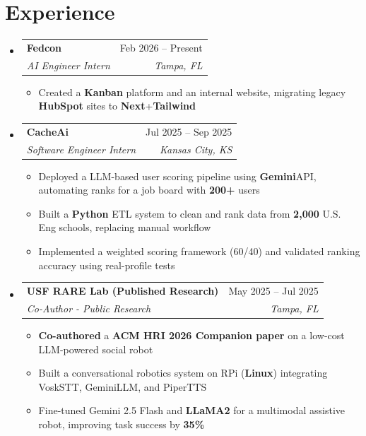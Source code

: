 \documentclass[letterpaper,11pt]{article}
\makeatletter
\newcommand{\resumeItem}[1]{
  \item\small{
    {#1 \vspace{-2pt}}
  }
}
\newcommand{\resumeSubheading}[4]{
  \vspace{-2pt}\item
    \begin{tabular*}{0.97\textwidth}[t]{l@{\extracolsep{\fill}}r}
      \textbf{#1} & #2 \\
      \textit{\small#3} & \textit{\small #4} \\
    \end{tabular*}\vspace{-7pt}
}
\newcommand{\resumeSubSubheading}[2]{
    \item
    \begin{tabular*}{0.97\textwidth}{l@{\extracolsep{\fill}}r}
      \textit{\small#1} & \textit{\small #2} \\
    \end{tabular*}\vspace{-7pt}
}
\newcommand{\resumeSubHeadingListStart}{\begin{itemize}[leftmargin=0.15in, label={}]}
\newcommand{\resumeSubHeadingListEnd}{\end{itemize}}
\newcommand{\resumeItemListStart}{\begin{itemize}}
\newcommand{\resumeItemListEnd}{\end{itemize}\vspace{-5pt}}
\makeatother
\begin{document}
\section{Experience}
  \resumeSubHeadingListStart
      \resumeSubheading
      {Fedcon}{Feb 2026 -- Present}
      {AI Engineer Intern}{Tampa, FL}
      \resumeItemListStart
        \resumeItem{Created a \textbf{Kanban} platform and an internal website, migrating legacy \textbf{HubSpot} sites to \textbf{Next}+\textbf{Tailwind}}
        
        \resumeItemListEnd
      

    \resumeSubheading
      {CacheAi}{Jul 2025 -- Sep 2025}
      {Software Engineer Intern}{Kansas City, KS}
      \resumeItemListStart
        \resumeItem{Deployed a LLM-based user scoring pipeline using \textbf{Gemini}API, automating ranks for a job board with \textbf{200+} users}
        \vspace{-1.2em}
        \resumeItem{Built a \textbf{Python} ETL system to clean and rank data from \textbf{2,000} U.S. Eng schools, replacing manual workflow}
        \resumeItem{Implemented a weighted scoring framework (60/40) and validated ranking accuracy using real-profile tests}
      \resumeItemListEnd
      

    \resumeSubheading
      {{USF RARE Lab (Published Research)}}{May 2025 -- Jul 2025}
      {Co-Author - Public Research}{Tampa, FL}
      \resumeItemListStart
      \resumeItem{
\textbf{Co-authored }a \textbf{ACM HRI 2026 Companion paper} on a low-cost LLM-powered social robot
}
        \resumeItem{Built a conversational robotics system on RPi (\textbf{Linux}) integrating VoskSTT, GeminiLLM, and PiperTTS}
        \resumeItem{Fine-tuned Gemini 2.5 Flash and \textbf{LLaMA2} for a multimodal assistive robot, improving task success by \textbf{35\%}}
    \resumeItemListEnd
  \resumeSubHeadingListEnd


\end{document}

